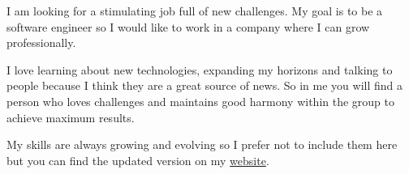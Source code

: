 \documentclass[9pt]{developercv} %
\begin{document}
\begin{minipage}[t]{0.3\textwidth}
	\vspace{-\baselineskip} %

	
	I am looking for a stimulating job full of new challenges. 
	My goal is to be a software engineer so I would like to work in a company where 
	I can grow professionally.
\end{minipage}
\hfill
\begin{minipage}[t]{0.3\textwidth}
	\vspace{-\baselineskip} %
	

	I love learning about new technologies, 
	expanding my horizons and talking to people because I think they are a great source of news.
	So in me you will find a person who loves challenges and maintains good harmony within 
	the group to achieve maximum results.
\end{minipage}
\hfill
\begin{minipage}[t]{0.3\textwidth}
	\vspace{-\baselineskip} %
	
	
	My skills are always growing and evolving so I prefer not to include them here 
	but you can find the updated version on my \href{https://dagyu.netlify.app/#skills}{website}.
\end{minipage}


\end{document}
